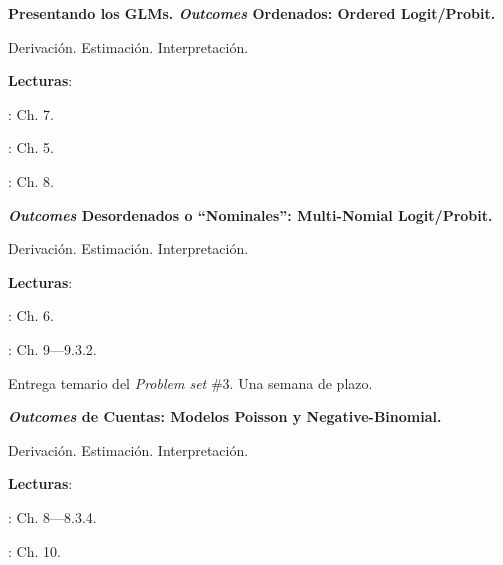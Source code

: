 \documentclass[letterpaper]{article}
\renewenvironment{itemize}{
  \begin{list}{}{
    \setlength{\leftmargin}{1.5em}
  }
}{
  \end{list}
}
\begin{document}
\begin{enumerate}[label=\roman*.]
       \begin{itemize} 
        \item[15.] {\bf Presentando los GLMs. \emph{Outcomes} Ordenados: Ordered Logit/Probit.}
        \begin{itemize} 
          \item[$\circ$] Derivaci\'on. Estimaci\'on. Interpretaci\'on.
          \item[$\circ$] {\bf Lecturas}: 
            \begin{itemize} 
              \item[$\diamond$] \textcite{Ward2018}: Ch. 7. 
              \item[$\diamond$] \textcite{Long2001}: Ch. 5.
              \item[$\diamond$] \textcite{Ward2018}: Ch. 8. 
            \end{itemize}
        \end{itemize}
      \end{itemize}



       \begin{itemize} 
        \item[16.] {\bf \emph{Outcomes} Desordenados o ``Nominales'': Multi-Nomial Logit/Probit.}
        \begin{itemize} 
          \item[$\circ$] Derivaci\'on. Estimaci\'on. Interpretaci\'on.
          \item[$\circ$] {\bf Lecturas}: 
            \begin{itemize} 
              \item[$\diamond$] \textcite{Long2001}: Ch. 6.
              \item[$\diamond$] \textcite{Ward2018}: Ch. 9---9.3.2.
            \end{itemize}
        \end{itemize}
      \end{itemize}



\item[{\color{red}\Pointinghand}] Entrega temario del \emph{Problem set} \#3. Una semana de plazo.



       \begin{itemize} 
        \item[17.] {\bf \emph{Outcomes} de Cuentas: Modelos Poisson y Negative-Binomial.}
        \begin{itemize} 
          \item[$\circ$] Derivaci\'on. Estimaci\'on. Interpretaci\'on.
          \item[$\circ$] {\bf Lecturas}: 
            \begin{itemize} 
              \item[$\diamond$] \textcite{Long2001}: Ch. 8---8.3.4.
              \item[$\diamond$] \textcite{Ward2018}: Ch. 10.
            \end{itemize}
        \end{itemize}
      \end{itemize}




\end{enumerate}
\end{document}
